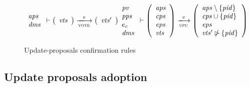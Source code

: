 \begin{figure}[htb]
\begin{equation}
{      {
        \begin{array}{l}
          \var{aps}\\
          \var{dms}
        \end{array}
      }
      \vdash
      {
        \left(
          \begin{array}{l}
            \var{vts}
          \end{array}
        \right)
      }
      \trans{vote}{\var{v}}
      {
        \left(
          \begin{array}{l}
            \var{vts'}
          \end{array}
        \right)
      }
    }
    {
      {
        \begin{array}{l}
          \var{pv}\\
          \var{pps}\\
          e_c\\
          \var{dms}
        \end{array}
      }
      \vdash
      {
        \left(
          \begin{array}{l}
            \var{aps}\\
            \var{cps}\\
            \var{eps}\\
            \var{vts}
          \end{array}
        \right)
      }
      \trans{upc}{\var{v}}
      {
        \left(
          \begin{array}{l}
            \var{aps} \setminus \{\var{pid}\} \\
            \var{cps} \union  \{\var{pid}\} \\
            \var{eps}\\
            \var{vts'} \subtractrange \{\var{pid}\}
          \end{array}
        \right)
      }
    }
  \end{equation}
  \caption{Update-proposals confirmation rules}
  \label{fig:rules:up-confirmation}
\end{figure}

\clearpage

\subsection{Update proposals adoption}
\label{sec:update-proposals-adoption}

